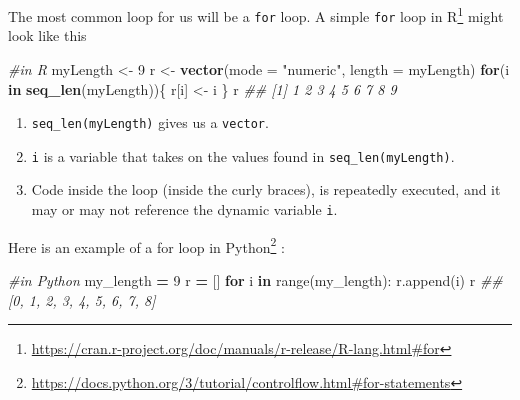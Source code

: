 \documentclass[12pt,krantz2]{krantz}
\makeatletter
\newenvironment{Shaded}{\begin{snugshade}}{\end{snugshade}}
\newcommand{\BuiltInTok}[1]{#1}
\newcommand{\CommentTok}[1]{\textcolor[rgb]{0.37,0.37,0.37}{\textit{#1}}}
\newcommand{\ControlFlowTok}[1]{\textcolor[rgb]{0.27,0.27,0.27}{\textbf{#1}}}
\newcommand{\DataTypeTok}[1]{\textcolor[rgb]{0.27,0.27,0.27}{#1}}
\newcommand{\DecValTok}[1]{\textcolor[rgb]{0.06,0.06,0.06}{#1}}
\newcommand{\KeywordTok}[1]{\textcolor[rgb]{0.27,0.27,0.27}{\textbf{#1}}}
\newcommand{\NormalTok}[1]{#1}
\newcommand{\OperatorTok}[1]{\textcolor[rgb]{0.43,0.43,0.43}{\textbf{#1}}}
\newcommand{\StringTok}[1]{\textcolor[rgb]{0.5,0.5,0.5}{#1}}
\providecommand{\tightlist}{%
  \setlength{\itemsep}{0pt}\setlength{\parskip}{0pt}}
\renewcommand{\href}[2]{#2\footnote{\url{#1}}}
\newenvironment{kframe}{%
\medskip{}
\setlength{\fboxsep}{.8em}
 \def\at@end@of@kframe{}%
 \ifinner\ifhmode%
  \def\at@end@of@kframe{\end{minipage}}%
  \begin{minipage}{\columnwidth}%
 \fi\fi%
 \def\FrameCommand##1{\hskip\@totalleftmargin \hskip-\fboxsep
 \colorbox{shadecolor}{##1}\hskip-\fboxsep
     \hskip-\linewidth \hskip-\@totalleftmargin \hskip\columnwidth}%
 \MakeFramed {\advance\hsize-\width
   \@totalleftmargin\z@ \linewidth\hsize
   \@setminipage}}%
 {\par\unskip\endMakeFramed%
 \at@end@of@kframe}
\renewenvironment{Shaded}{\begin{kframe}}{\end{kframe}}
\makeatother
\begin{document}
The most common loop for us will be a \texttt{for} loop. A simple \href{https://cran.r-project.org/doc/manuals/r-release/R-lang.html\#for}{\texttt{for} loop in R} might look like this

\begin{Shaded}
\begin{Highlighting}[]
\CommentTok{#in R}
\NormalTok{myLength <-}\StringTok{ }\DecValTok{9}
\NormalTok{r <-}\StringTok{ }\KeywordTok{vector}\NormalTok{(}\DataTypeTok{mode =} \StringTok{"numeric"}\NormalTok{, }\DataTypeTok{length =}\NormalTok{ myLength)}
\ControlFlowTok{for}\NormalTok{(i }\ControlFlowTok{in} \KeywordTok{seq_len}\NormalTok{(myLength))\{}
\NormalTok{  r[i] <-}\StringTok{ }\NormalTok{i}
\NormalTok{\}}
\NormalTok{r}
\CommentTok{## [1] 1 2 3 4 5 6 7 8 9}
\end{Highlighting}
\end{Shaded}

\begin{enumerate}
\def\labelenumi{\arabic{enumi}.}
\tightlist
\item
  \texttt{seq\_len(myLength)} gives us a \texttt{vector}.
\item
  \texttt{i} is a variable that takes on the values found in \texttt{seq\_len(myLength)}.
\item
  Code inside the loop (inside the curly braces), is repeatedly executed, and it may or may not reference the dynamic variable \texttt{i}.
\end{enumerate}

\href{https://docs.python.org/3/tutorial/controlflow.html\#for-statements}{Here is an example of a for loop in Python} \citep{Lutz13}:

\begin{Shaded}
\begin{Highlighting}[]
\CommentTok{#in Python}
\NormalTok{my_length }\OperatorTok{=} \DecValTok{9}
\NormalTok{r }\OperatorTok{=}\NormalTok{ []}
\ControlFlowTok{for}\NormalTok{ i }\KeywordTok{in} \BuiltInTok{range}\NormalTok{(my_length):}
\NormalTok{    r.append(i)}
\NormalTok{r}
\CommentTok{## [0, 1, 2, 3, 4, 5, 6, 7, 8]}
\end{Highlighting}
\end{Shaded}
\end{document}
